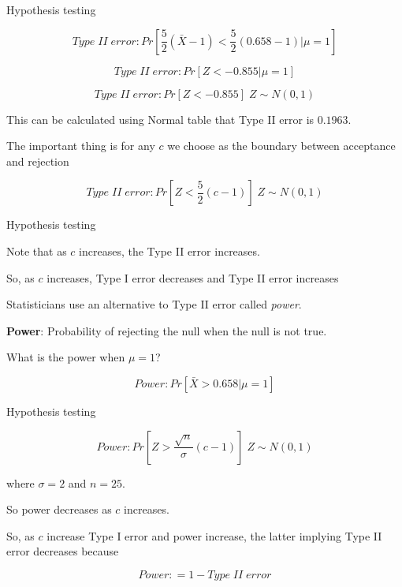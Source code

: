 \documentclass{beamer}\usepackage[]{graphicx}\usepackage[]{color}
\begin{document}
\begin{frame}{Hypothesis testing}

$$ Type \; II \; error:  Pr \left [ \frac{5}{2} (\bar{X} - 1) < \frac{5}{2}(0.658-1) | \mu=1 \right] $$

$$ Type \; II \; error:  Pr \left [ Z < -0.855 |\mu=1 \right ] $$

$$ Type \; II \; error:  Pr \left [ Z < -0.855  \right] \; Z \sim N(0,1) $$

This can be calculated using Normal table that Type II error is $0.1963$.


The important thing is for any  $c$ we choose as the boundary between acceptance and rejection 

$$ Type \; II \; error:  Pr \left [ Z < \frac{5}{2}(c-1)  \right] \; Z \sim N(0,1) $$

\end{frame}

\begin{frame}{Hypothesis testing}

Note that as $c$ increases, the Type II error increases. \pause \newline

So, as $c$ increases, Type I error decreases and Type II error increases \pause \newline

Statisticians use an alternative to Type II error called \textit{power}. \pause \newline

\textbf{Power}: Probability of rejecting the null when the null is not true.

What is the power when $\mu=1$?

$$ Power: Pr \left [ \bar{X} > 0.658 | \mu=1 \right] $$

\end{frame}

\begin{frame}{Hypothesis testing}

$$ Power:  Pr \left [ Z > \frac{\sqrt{n}}{\sigma}(c-1)  \right] \; Z \sim N(0,1) $$

where $\sigma=2$ and $n=25$.

So power decreases  as $c$ increases. \pause \newline

So, as $c$ increase Type I error and power increase, the latter implying Type II error decreases because 

$$ Power : = 1 - Type \; II \; error $$

\end{frame}
\end{document}

